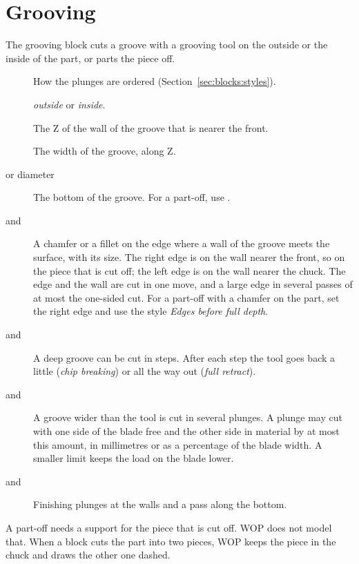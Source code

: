 \section{Grooving}\label{sec:blocks:grooving}


The grooving block cuts a groove with a grooving tool on the outside or the inside of the part, or parts the piece off.

\begin{description}
\item[] How the plunges are ordered (Section~\ref{sec:blocks:styles}).
\item[] \emph{outside} or \emph{inside}.
\item[] The Z of the wall of the groove that is nearer the front.
\item[] The width of the groove, along Z.
\item[ or diameter] The bottom of the groove. For a part-off, use .
\item[ and ] A chamfer or a fillet on the edge where a wall of the groove meets the surface, with its size. The right edge is on the wall nearer the front, so on the piece that is cut off; the left edge is on the wall nearer the chuck. The edge and the wall are cut in one move, and a large edge in several passes of at most the one-sided cut. For a part-off with a chamfer on the part, set the right edge and use the style \emph{Edges before full depth}.
\item[ and ] A deep groove can be cut in steps. After each step the tool goes back a little (\emph{chip breaking}) or all the way out (\emph{full retract}).
\item[ and ] A groove wider than the tool is cut in several plunges. A plunge may cut with one side of the blade free and the other side in material by at most this amount, in millimetres or as a percentage of the blade width. A smaller limit keeps the load on the blade lower.
\item[ and ] Finishing plunges at the walls and a pass along the bottom.
\end{description}

\begin{notebox}
A part-off needs a support for the piece that is cut off. WOP does not model that. When a block cuts the part into two pieces, WOP keeps the piece in the chuck and draws the other one dashed.
\end{notebox}


